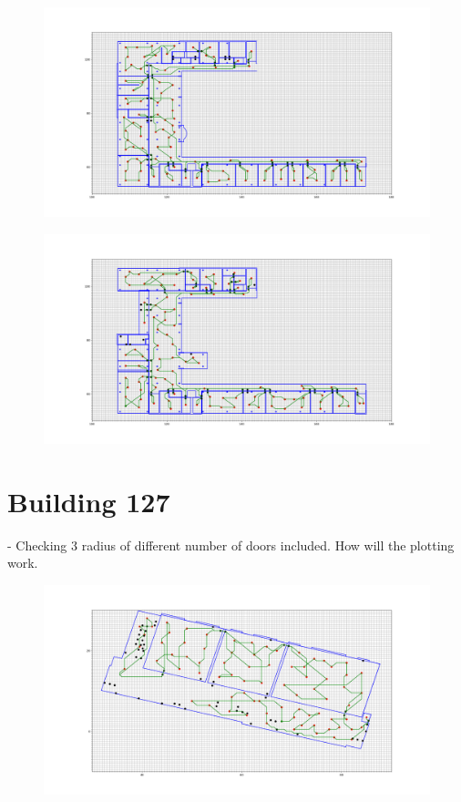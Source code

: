 \begin{figure}[H]
    \centering
    \includegraphics[width=1\textwidth]{fig/Resultater/Rac/-5.95_min_height_radius0.01.png}
    \label{Rum knudepu}
    \caption[Design overview]{}
\end{figure}


\begin{figure}[H]
    \centering
    \includegraphics[width=1\textwidth]{fig/Resultater/Rac/-9.7_min_height_radius0.01.png}
    \label{Rum knudepu}
    \caption[Design overview]{}
\end{figure}


\section{Building 127}
- Checking 3 radius of different number of doors included.
How will the plotting work.
\begin{figure}[H]
    \centering
    \includegraphics[width=1\textwidth]{fig/Resultater/127/0.31_min_height.png}
    \label{Rum knudepu}
    \caption[Design overview]{}
\end{figure}

